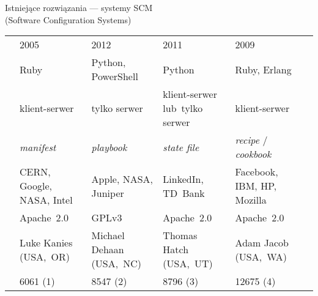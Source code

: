 \documentclass[notes,polish,xcolor=dvipsnames,hyperref={unicode,hidelinks,pdftex,pdfauthor={Patryk Bęza},pdftitle={Protokół zarządzania stacjami komputerowymi pod kontrolą systemu Linux},pdfsubject={Praca dyplomowa magisterska na Wydziale Matematyki i Nauk Informacyjnych Politechniki Warszawskiej},pdfkeywords={Software Configuration Management, SCM, Infrastructure as Code, IaC, Linux, Communications Protocol},pdfproducer={XeLaTeX},pdfcreator={latexmk}}]{beamer}
\begin{document}
\begin{frame}[fragile]{Istniejące rozwiązania --- systemy SCM\\[-0.2cm]{\footnotesize (Software Configuration Systems)}}
\begin{adjustbox}{center}
	\tiny
	\begin{tabular}{L{1.8cm}|M{2cm}|M{2cm}|M{2cm}|M{2cm}N}
		                               & \puppetlogo               & \ansiblelogo             & \saltlogo                      & \cheflogo                       \\\hline\hline
		      & 2005                      & 2012                     & 2011                           & 2009                            \\\hline
		              & Ruby                      & Python, PowerShell       & Python                         & Ruby, Erlang                    \\\hline
		              & klient-serwer             & tylko serwer             & klient-serwer lub~tylko serwer & klient-serwer                   \\\hline
		  & \emph{manifest}           & \emph{playbook}          & \emph{state file}              & \emph{recipe} / \emph{cookbook} \\\hline
		  & CERN, Google, NASA, Intel & Apple, NASA, Juniper     & LinkedIn, TD~Bank              & Facebook, IBM, HP, Mozilla      \\\hline
		           & Apache~2.0                & GPLv3                    & Apache~2.0                     & Apache~2.0                      \\\hline
		         & Luke Kanies (USA,~OR)     & Michael Dehaan (USA,~NC) & Thomas Hatch (USA,~UT)         & Adam Jacob (USA,~WA)            \\\hline
		\fixedcell{\popularity}        & 6061 (1)                  & 8547 (2)                 & 8796 (3)                       & 12675 (4)
	\end{tabular}
\end{adjustbox}
\vfill

\end{frame}
\end{document}
